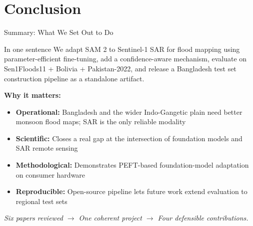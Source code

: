 \documentclass[10pt,aspectratio=169]{beamer}
\begin{document}
\section{Conclusion}

\begin{frame}{Summary: What We Set Out to Do}
\begin{exampleblock}{In one sentence}
We adapt SAM 2 to Sentinel-1 SAR for flood mapping using parameter-efficient fine-tuning, add a confidence-aware mechanism, evaluate on Sen1Floods11 + Bolivia + Pakistan-2022, and release a Bangladesh test set construction pipeline as a standalone artifact.
\end{exampleblock}

\vspace{0.8em}
\textbf{Why it matters:}
\begin{itemize}
\item \textbf{Operational:} Bangladesh and the wider Indo-Gangetic plain need better monsoon flood maps; SAR is the only reliable modality
\item \textbf{Scientific:} Closes a real gap at the intersection of foundation models and SAR remote sensing
\item \textbf{Methodological:} Demonstrates PEFT-based foundation-model adaptation on consumer hardware
\item \textbf{Reproducible:} Open-source pipeline lets future work extend evaluation to regional test sets
\end{itemize}

\vspace{0.5em}
\centering
\textit{Six papers reviewed $\rightarrow$ One coherent project $\rightarrow$ Four defensible contributions.}
\end{frame}
\end{document}
